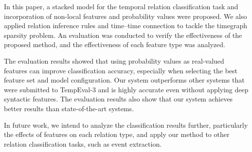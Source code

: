 \documentclass[english]{jnlp_1.4}
\begin{document}
\vspace{-0.5\Cvs}
In this paper, a stacked model for the temporal relation classification task and incorporation of non-local features and probability values were proposed.
We also applied relation inference rules and time--time connection to tackle the timegraph sparsity problem.
An evaluation was conducted to verify the effectiveness of the proposed method, and the effectiveness of each feature type was analyzed.

The evaluation results showed that using probability values as real-valued features can improve classification accuracy, especially when selecting the best feature set and model configuration. 
Our system outperforms other systems that were submitted to TempEval-3 and is highly accurate even without applying deep syntactic features.
The evaluation results also show that our system achieves better results than state-of-the-art systems.

In future work, we intend to analyze the classification results further, particularly the effects of features on each relation type, and apply our method to other relation classification tasks, such as event extraction.
\end{document}
